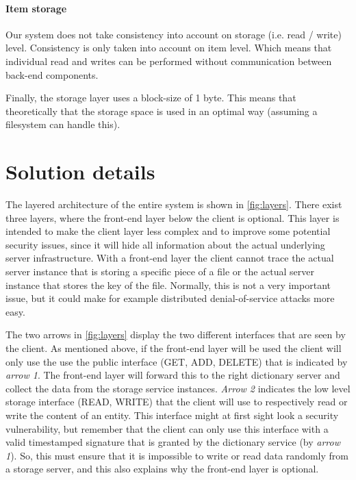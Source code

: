 \documentclass[12pt,a4paper]{scrartcl}
\begin{document}
\paragraph{Item storage}
Our system does not take consistency into account on storage (i.e. read / write) level. Consistency is only taken into account on item level. Which means that individual read and writes can be performed without communication between back-end components.

Finally, the storage layer uses a block-size of 1 byte. This means that theoretically that the storage space is used in an optimal way (assuming a filesystem can handle this).

\section{Solution details}
The layered architecture of the entire system is shown in \autoref{fig:layers}. There exist three layers, where the front-end layer below the client is optional. This layer is intended to make the client layer less complex and to improve some potential security issues, since it will hide all information about the actual underlying server infrastructure. With a front-end layer the client cannot trace the actual server instance that is storing a specific piece of a file or the actual server instance that stores the key of the file. Normally, this is not a very important issue, but it could make for example distributed denial-of-service attacks more easy.

The two arrows in \autoref{fig:layers} display the two different interfaces that are seen by the client. As mentioned above, if the front-end layer will be used the client will only use the use the public interface (GET, ADD, DELETE) that is indicated by \emph{arrow 1}. The front-end layer will forward this to the right dictionary server and collect the data from the storage service instances. \emph{Arrow 2} indicates the low level storage interface (READ, WRITE) that the client will use to respectively read or write the content of an entity. This interface might at first sight look a security vulnerability, but remember that the client can only use this interface with a valid timestamped signature that is granted by the dictionary service (by \emph{arrow 1}). So, this must ensure that it is impossible to write or read data randomly from a storage server, and this also explains why the front-end layer is optional.
\end{document}
